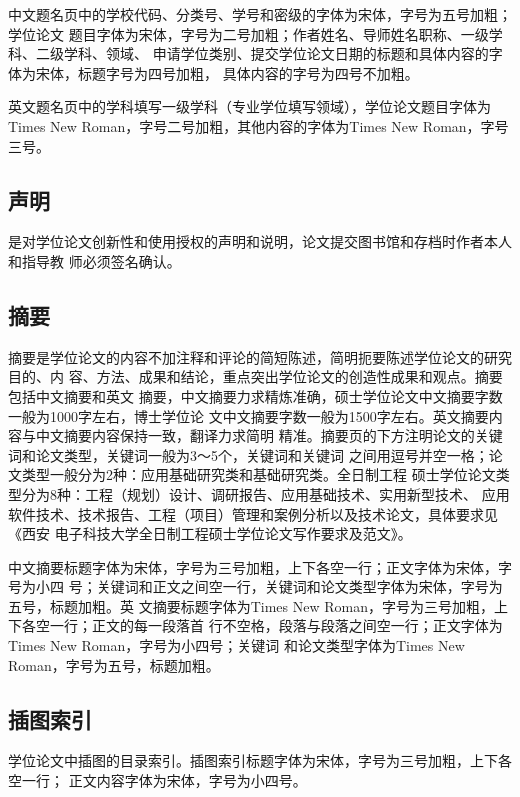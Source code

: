 中文题名页中的学校代码、分类号、学号和密级的字体为宋体，字号为五号加粗；学位论文
题目字体为宋体，字号为二号加粗；作者姓名、导师姓名职称、一级学科、二级学科、领域、
申请学位类别、提交学位论文日期的标题和具体内容的字体为宋体，标题字号为四号加粗，
具体内容的字号为四号不加粗。

英文题名页中的学科填写一级学科（专业学位填写领域），学位论文题目字体为Times New
Roman，字号二号加粗，其他内容的字体为Times New Roman，字号三号。

\subsection{声明}

是对学位论文创新性和使用授权的声明和说明，论文提交图书馆和存档时作者本人和指导教
师必须签名确认。

\subsection{摘要}

摘要是学位论文的内容不加注释和评论的简短陈述，简明扼要陈述学位论文的研究目的、内
容、方法、成果和结论，重点突出学位论文的创造性成果和观点。摘要包括中文摘要和英文
摘要，中文摘要力求精炼准确，硕士学位论文中文摘要字数一般为1000字左右，博士学位论
文中文摘要字数一般为1500字左右。英文摘要内容与中文摘要内容保持一致，翻译力求简明
精准。摘要页的下方注明论文的关键词和论文类型，关键词一般为3～5个，关键词和关键词
之间用逗号并空一格；论文类型一般分为2种：应用基础研究类和基础研究类。全日制工程
硕士学位论文类型分为8种：工程（规划）设计、调研报告、应用基础技术、实用新型技术、
应用软件技术、技术报告、工程（项目）管理和案例分析以及技术论文，具体要求见《西安
电子科技大学全日制工程硕士学位论文写作要求及范文》。

中文摘要标题字体为宋体，字号为三号加粗，上下各空一行；正文字体为宋体，字号为小四
号；关键词和正文之间空一行，关键词和论文类型字体为宋体，字号为五号，标题加粗。英
文摘要标题字体为Times New Roman，字号为三号加粗，上下各空一行；正文的每一段落首
行不空格，段落与段落之间空一行；正文字体为Times New Roman，字号为小四号；关键词
和论文类型字体为Times New Roman，字号为五号，标题加粗。

\subsection{插图索引}

学位论文中插图的目录索引。插图索引标题字体为宋体，字号为三号加粗，上下各空一行；
正文内容字体为宋体，字号为小四号。

